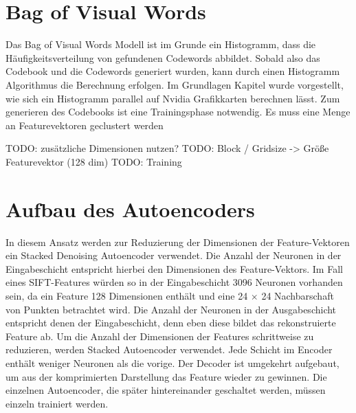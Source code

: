 \section{Bag of Visual Words}

Das Bag of Visual Words Modell ist im Grunde ein Histogramm, dass die Häufigkeitsverteilung von gefundenen Codewords abbildet. Sobald also das Codebook und die Codewords generiert wurden, kann durch einen Histogramm Algorithmus die Berechnung erfolgen. Im Grundlagen Kapitel wurde vorgestellt, wie sich ein Histogramm parallel auf Nvidia Grafikkarten berechnen lässt. Zum generieren des Codebooks ist eine Trainingsphase notwendig. Es muss eine Menge an Featurevektoren geclustert werden 

TODO: zusätzliche Dimensionen nutzen?
TODO: Block / Gridsize -> Größe Featurevektor (128 dim)
TODO: Training

\section{Aufbau des Autoencoders}

In diesem Ansatz werden zur Reduzierung der Dimensionen der Feature-Vektoren ein Stacked Denoising Autoencoder verwendet. Die Anzahl der Neuronen in der Eingabeschicht entspricht hierbei den Dimensionen des Feature-Vektors. Im Fall eines SIFT-Features würden so in der Eingabeschicht 3096 Neuronen vorhanden sein, da ein Feature 128 Dimensionen enthält und eine 24 $\times$ 24 Nachbarschaft von Punkten betrachtet wird. Die Anzahl der Neuronen in der Ausgabeschicht entspricht denen der Eingabeschicht, denn eben diese bildet das rekonstruierte Feature ab. Um die Anzahl der Dimensionen der Features schrittweise zu reduzieren, werden Stacked Autoencoder verwendet. Jede Schicht im Encoder enthält weniger Neuronen als die vorige. Der Decoder ist umgekehrt aufgebaut, um aus der komprimierten Darstellung das Feature wieder zu gewinnen. Die einzelnen Autoencoder, die später hintereinander geschaltet werden, müssen einzeln trainiert werden.
